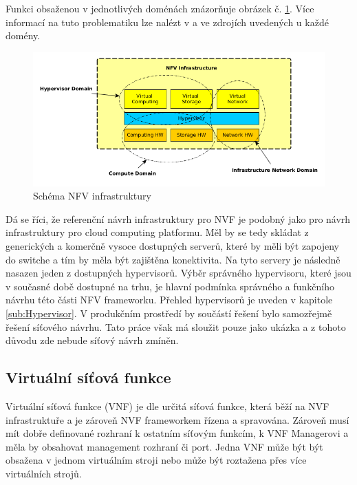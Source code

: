 Funkci obsaženou v jednotlivých doménách znázorňuje obrázek č. \ref{fig:infrastruktura}. Více informací na tuto problematiku lze nalézt v \cite{NFV_infrastructure} a ve zdrojích uvedených u každé domény. 

\begin{figure}[h]
\begin{centering}
\includegraphics[scale=0.65]{images/infrastruktura}
\par\end{centering}
\caption{Schéma NFV infrastruktury\label{fig:infrastruktura}}
\end{figure}

Dá se říci, že referenční návrh infrastruktury pro NVF je podobný jako pro návrh infrastruktury pro cloud computing platformu. Měl by se tedy skládat z generických a komerčně vysoce dostupných serverů, které by měli být zapojeny do switche a tím by měla být zajištěna konektivita. Na tyto servery je následně nasazen jeden z dostupných hypervisorů. Výběr správného hypervisoru, které jsou v současné době dostupné na trhu, je hlavní podmínka správného a funkčního návrhu této části NFV frameworku. Přehled hypervisorů je uveden v kapitole \ref{sub:Hypervisor}. V produkčním prostředí by součástí řešení bylo samozřejmě řešení síťového návrhu. Tato práce však má sloužit pouze jako ukázka a z tohoto důvodu zde nebude síťový návrh zmíněn.

\subsection{Virtuální síťová funkce}

Virtuální síťová funkce (VNF) je dle \cite{NFV_VNF} určitá síťová funkce, která běží na NVF infrastruktuře a je zároveň NVF frameworkem řízena a spravována. Zároveň musí mít dobře definované rozhraní k ostatním síťovým funkcím, k VNF Managerovi a měla by obsahovat management rozhraní či port. Jedna VNF může být být obsažena v jednom virtuálním stroji nebo může být roztažena přes více virtuálních strojů. 

